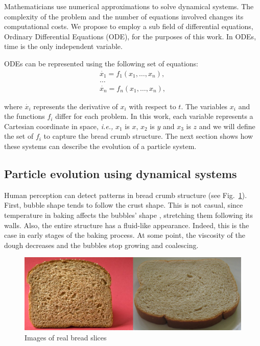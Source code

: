 \documentclass[oneside,a4paper,english,links]{amca}
\begin{document}
Mathematicians use numerical approximations to solve dynamical systems. The complexity of the problem and the number of equations involved changes its computational costs. We propose to employ a sub field of differential equations, Ordinary Differential Equations (ODE), for the purposes of this work. In ODEs, time is the only independent variable.

ODEs can be represented using the following set of equations:
\begin{equation} \label{eq:simple}  
  \begin{aligned}
    \dot{x_{1}} = f_{1}(x_{1},\ldots,x_{n}),\\
    \ldots\\
    \dot{x_{n}} = f_{n}(x_{1},\ldots,x_{n}),
  \end{aligned}
\end{equation}

\noindent where $\dot{x_{i}}$ represents the derivative of $x_{i}$ with respect
to $t$. The variables $x_{i}$ and the functions $f_{i}$
differ for each problem. In this work, each variable represents a
Cartesian coordinate in space, {\em i.e.,} $x_{1}$ is $x$, $x_{2}$ is
$y$ and $x_{3}$ is $z$ and we will define the set of $f_{i}$ to capture the bread crumb structure. The next section shows how these
systems can describe the evolution of a particle system.

\subsection{Particle evolution using dynamical systems}

Human perception can detect patterns in bread crumb structure (see
Fig.~\ref{fg:fig2}). First, bubble shape tends
to follow the crust shape. This is not casual, since temperature in
baking affects the bubbles' shape \citep{Scanlon2001}, stretching
them following its walls. Also, the entire
structure has a fluid-like appearance. Indeed, this is the case in
early stages of the baking process. At some point, the viscosity
of the dough decreases and the bubbles stop growing and
coalescing.

\begin{figure}[htb!]
  \centerline{\includegraphics[scale=0.45]{fig2}}
  \caption{Images of real bread slices}
  \label{fg:fig2}
\end{figure}
\end{document}
